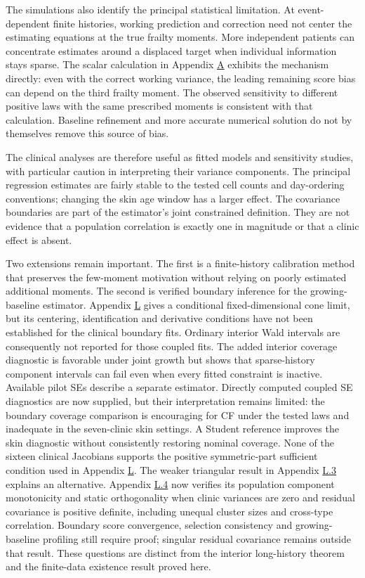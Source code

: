 \documentclass[11pt]{article}
\begin{document}
The simulations also identify the principal statistical limitation. At event-dependent finite histories, working prediction and correction need not center the estimating equations at the true frailty moments. More independent patients can concentrate estimates around a displaced target when individual information stays sparse. The scalar calculation in Appendix \hyperref[sec:A]{A} exhibits the mechanism directly: even with the correct working variance, the leading remaining score bias can depend on the third frailty moment. The observed sensitivity to different positive laws with the same prescribed moments is consistent with that calculation. Baseline refinement and more accurate numerical solution do not by themselves remove this source of bias.

The clinical analyses are therefore useful as fitted models and sensitivity studies, with particular caution in interpreting their variance components. The principal regression estimates are fairly stable to the tested cell counts and day-ordering conventions; changing the skin age window has a larger effect. The covariance boundaries are part of the estimator's joint constrained definition. They are not evidence that a population correlation is exactly one in magnitude or that a clinic effect is absent.

Two extensions remain important. The first is a finite-history calibration method that preserves the few-moment motivation without relying on poorly estimated additional moments. The second is verified boundary inference for the growing-baseline estimator. Appendix \hyperref[sec:L]{L} gives a conditional fixed-dimensional cone limit, but its centering, identification and derivative conditions have not been established for the clinical boundary fits. Ordinary interior Wald intervals are consequently not reported for those coupled fits. The added interior coverage diagnostic is favorable under joint growth but shows that sparse-history component intervals can fail even when every fitted constraint is inactive. Available pilot SEs describe a separate estimator. Directly computed coupled SE diagnostics are now supplied, but their interpretation remains limited: the boundary coverage comparison is encouraging for CF under the tested laws and inadequate in the seven-clinic skin settings. A Student reference improves the skin diagnostic without consistently restoring nominal coverage. None of the sixteen clinical Jacobians supports the positive symmetric-part sufficient condition used in Appendix \hyperref[sec:L]{L}. The weaker triangular result in Appendix \hyperref[sec:L.3]{L.3} explains an alternative. Appendix \hyperref[sec:L.4]{L.4} now verifies its population component monotonicity and static orthogonality when clinic variances are zero and residual covariance is positive definite, including unequal cluster sizes and cross-type correlation. Boundary score convergence, selection consistency and growing-baseline profiling still require proof; singular residual covariance remains outside that result. These questions are distinct from the interior long-history theorem and the finite-data existence result proved here.
\end{document}
